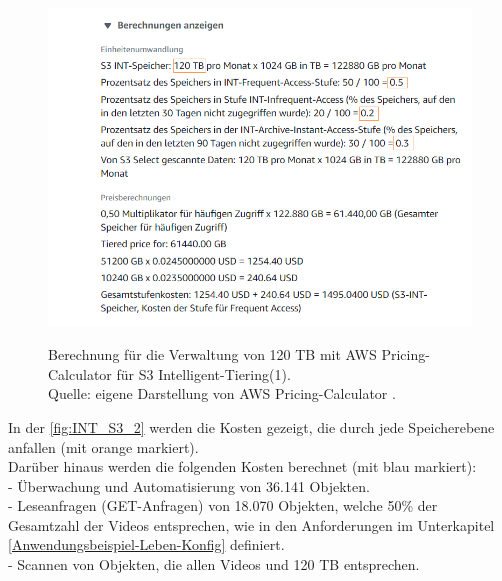 \begin{figure}[h!]
  \centering
  \includegraphics[scale=0.6]{sources/S3_INT_1}
  \caption[Berechnung für die Verwaltung von 120 TB mit AWS Pricing-Calculator für S3 Intelligent-Tiering(1)]{}
  \label{fig:INT_S3_1} Berechnung für die Verwaltung von 120 TB mit AWS Pricing-Calculator für S3 Intelligent-Tiering(1).\\
  Quelle: eigene Darstellung von AWS Pricing-Calculator \cite{AMZ17-S3}.
\end{figure}
\newpage
In der \autoref{fig:INT_S3_2} werden die Kosten gezeigt, die durch jede Speicherebene anfallen (mit orange markiert). 
\\
Darüber hinaus werden die folgenden Kosten berechnet (mit blau markiert): \\
- Überwachung und Automatisierung von 36.141 Objekten.\\
- Leseanfragen (GET-Anfragen) von 18.070 Objekten, welche 50\% der Gesamtzahl der Videos entsprechen, wie in den Anforderungen im Unterkapitel \ref{Anwendungsbeispiel-Leben-Konfig} definiert. \\
- Scannen von Objekten, die allen Videos und 120 TB entsprechen.
\\
